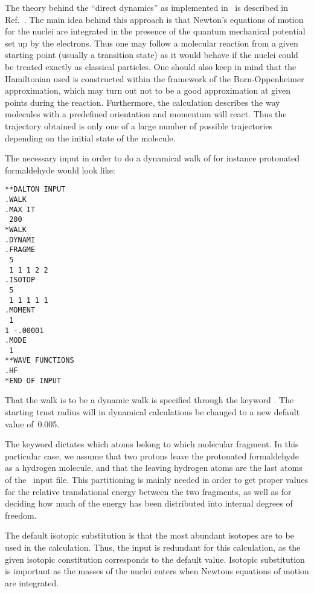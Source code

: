 The theory behind the ``direct dynamics'' as implemented in \siraba\ is
described in Ref.~\cite{theuhjajcpl173}. The
main idea behind this 
approach is that Newton's equations of motion for the nuclei are
integrated in the presence of the quantum mechanical potential set up
by the electrons. Thus one may follow a molecular reaction from a
given starting point (usually a transition state) as it would behave
if the nuclei could be treated exactly as classical particles. One
should also keep in mind that the Hamiltonian used is constructed within
the framework of the Born-Oppenheimer approximation, which may turn
out not to be a good approximation at given points during the
reaction. Furthermore, the calculation describes the way molecules
with a predefined orientation and momentum will react. Thus
the trajectory obtained is only one of a large number of 
possible trajectories depending on the initial state of the molecule.

The necessary input in order to do a dynamical walk of for instance
protonated formaldehyde would look like:

\begin{verbatim}
**DALTON INPUT
.WALK
.MAX IT
 200
*WALK
.DYNAMI
.FRAGME
 5
 1 1 1 2 2
.ISOTOP
 5
 1 1 1 1 1
.MOMENT
 1
1 -.00001
.MODE
 1
**WAVE FUNCTIONS
.HF
*END OF INPUT
\end{verbatim}

That the walk is to
be a dynamic walk is specified through the keyword . The
starting trust radius will in dynamical calculations be changed to a
new default value of~0.005.

The keyword  dictates which atoms belong to which
molecular fragment. In this particular
case, we assume that two 
protons leave the protonated formaldehyde as a
hydrogen molecule, and 
that the leaving hydrogen atoms are the last atoms of the \mol\ input
file. This partitioning is mainly needed in order to get 
proper values for the relative translational energy between the two
fragments, as well as for deciding how much of the energy has been
distributed into internal degrees of freedom.

The default isotopic substitution is that the most abundant isotopes
are to be used in the calculation. Thus, the input  is
redundant for this calculation, as the given isotopic constitution
corresponds to the default value. Isotopic substitution is important
as the masses of the nuclei enters when Newtons equations of motion are
integrated.

